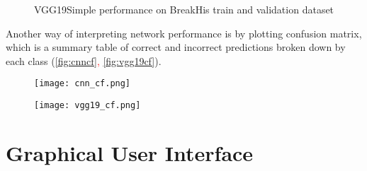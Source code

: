 \begin{figure}[h]
	\centering
	\caption{VGG19Simple performance on BreakHis train and validation dataset}
	\label{fig:vgg19perf}
\end{figure}

Another way of interpreting network performance is by plotting confusion matrix, which is a summary table of correct and incorrect predictions broken down by each class (\textcolor{red}{\autoref{fig:cnncf}, \autoref{fig:vgg19cf}}).

\begin{figure}[h]
	\centering
	\begin{minipage}{.5\textwidth}
		\centering
		\texttt{[image: cnn\_cf.png]}
		\label{fig:cnncf}
	\end{minipage}%
	\begin{minipage}{.5\textwidth}
		\centering
		\texttt{[image: vgg19\_cf.png]}
		\label{fig:vgg19cf}
	\end{minipage}
\end{figure}

\section{Graphical User Interface} \label{gui}


